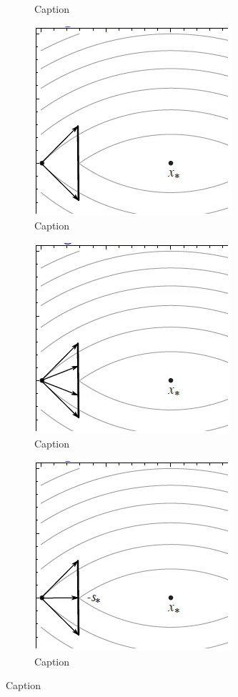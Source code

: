 \begin{figure}
\begin{subfigure}{0.31\textwidth}
        \caption{Caption}
        \label{fig:sub_example6}
    \end{subfigure}
    \begin{subfigure}{0.31\textwidth}
        \centering
        \includegraphics[scale=0.35]{figures/2/sub-example/sub_example7.png}
        \caption{Caption}
        \label{fig:sub_example7}
    \end{subfigure}
    \begin{subfigure}{0.31\textwidth}
        \centering
        \includegraphics[scale=0.35]{figures/2/sub-example/sub_example8.png}
        \caption{Caption}
        \label{fig:sub_example8}
    \end{subfigure}
    \begin{subfigure}{0.31\textwidth}
        \centering
        \includegraphics[scale=0.35]{figures/2/sub-example/sub_example9.png}
        \caption{Caption}
        \label{fig:sub_example9}
    \end{subfigure}
\end{figure}
%
